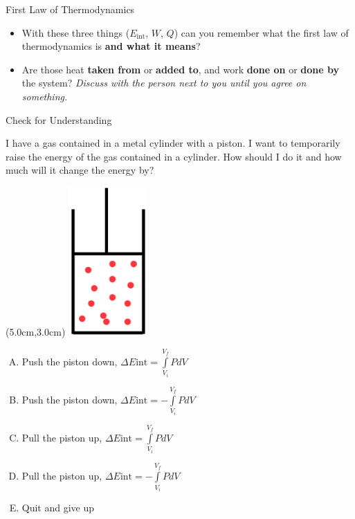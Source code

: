 \documentclass{beamer}
\newcommand{\red}[1]{{\color{red}{#1}}}
\newcommand{\checkl}[2]{\begin{textblock*}{1cm}(#1,#2){\large \red{\Checkmark}}\end{textblock*}}
\begin{document}
\begin{frame}[t]{First Law of Thermodynamics}
\begin{itemize}
   \item With these three things ($E_\text{int}$, $W$, $Q$) can you remember what the first law of thermodynamics is {\bf and what it means}?
   \item<3-> Are those heat {\bf taken from} or {\bf added to}, and work {\bf done on} or {\bf done by} the system? {\it Discuss with the person next to you until you agree on something.}
\end{itemize}
\end{frame}

\begin{frame}[t]{Check for Understanding}
\begin{center}
   I have a gas contained in a metal cylinder with a piston. I want to temporarily raise the energy of the gas contained in a cylinder. How should I do it and how much will it change the energy by?
   \begin{textblock*}{\textwidth}(5.0cm,3.0cm) %
      \includegraphics[width=3.0cm]{figures/mypiston.png}
   \end{textblock*}
   \begin{enumerate}[A.]
      \item Push the piston down, $\Delta E\text{int} = \int\limits_{V_i}^{V_f} PdV$
      \item Push the piston down, $\Delta E\text{int} = -\int\limits_{V_i}^{V_f} PdV$
      \item Pull the piston up, $\Delta E\text{int} = \int\limits_{V_i}^{V_f} PdV$
      \item Pull the piston up, $\Delta E\text{int} = -\int\limits_{V_i}^{V_f} PdV$
      \item Quit and give up
   \end{enumerate}
\only<2>{\checkl{0.5cm}{4.0cm}}
\end{center}
\end{frame}
\end{document}

